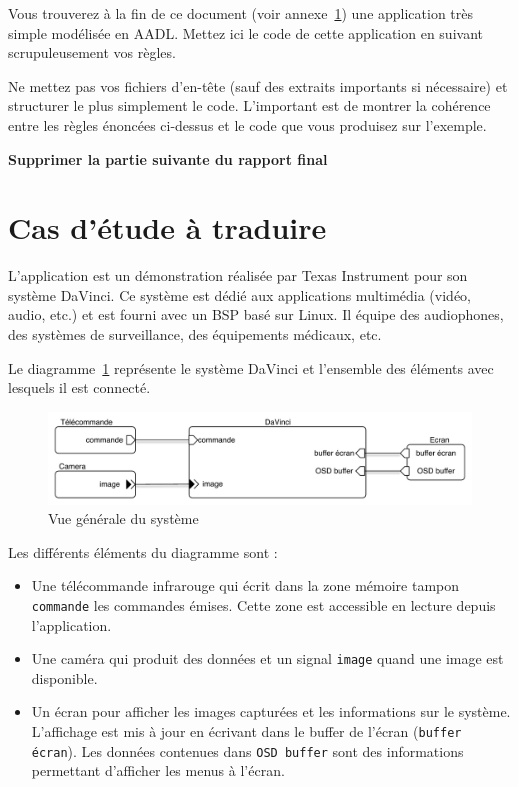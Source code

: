 \documentclass[11pt, a4paper]{paper}
\begin{document}
{\color{blue} Vous trouverez à la fin de ce document (voir annexe~\ref{ann:conception}) une application très simple modélisée en AADL. Mettez ici le code de cette application en suivant scrupuleusement vos règles.

Ne mettez pas vos fichiers d'en-tête (sauf des extraits importants si nécessaire) et structurer le plus simplement le code. L'important est de montrer la cohérence entre les règles énoncées ci-dessus et le code que vous produisez sur l'exemple.}



\newpage
\appendix
{\color{red}
\begin{framed}
\begin{center}{\bf\Large Supprimer la partie suivante du rapport final } \end{center}
\end{framed}
}

\section{Cas d'étude à traduire}
\label{ann:conception}

L'application est un démonstration réalisée par Texas Instrument pour son système DaVinci. Ce système est dédié aux applications multimédia (vidéo, audio, etc.) et est fourni avec un BSP basé sur Linux. Il équipe des audiophones, des systèmes de surveillance, des équipements médicaux, etc.

Le diagramme~\ref{fig:vue_gen} représente le système DaVinci et l'ensemble des éléments avec lesquels il est connecté.

\begin{figure}[htp]
\begin{center}
\includegraphics[scale=.6]{figures-pdf/contexte.pdf}
\caption{Vue générale du système}
\label{fig:vue_gen}
\end{center}
\end{figure}


Les différents éléments du diagramme sont :
\begin{itemize}
\item Une télécommande infrarouge qui écrit dans la zone mémoire tampon {\tt commande} les commandes émises. Cette zone est accessible en lecture depuis l'application.
\item Une caméra qui produit des données et un signal {\tt image} quand une image est disponible.
\item Un écran pour afficher les images capturées et les informations sur le système. L'affichage est mis à jour en écrivant dans le buffer de l'écran ({\tt buffer écran}). Les données contenues dans {\tt OSD buffer} sont des informations permettant d'afficher les menus à l'écran.
\end{itemize}
\end{document}
